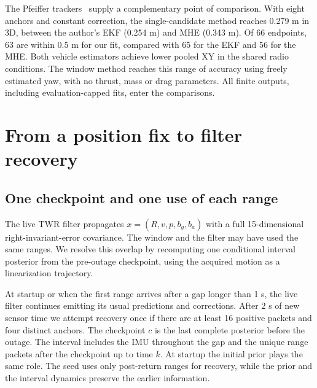 \documentclass{IEEEtaes}
\begin{document}
The Pfeiffer trackers~\cite{pfeiffer} supply a complementary point of comparison. With eight anchors and constant correction, the single-candidate method reaches 0.279 m in 3D, between the author's EKF (0.254 m) and MHE (0.343 m). Of 66 endpoints, 63 are within 0.5 m for our fit, compared with 65 for the EKF and 56 for the MHE. Both vehicle estimators achieve lower pooled XY in the shared radio conditions. The window method reaches this range of accuracy using freely estimated yaw, with no thrust, mass or drag parameters. All finite outputs, including evaluation-capped fits, enter the comparisons.

\section{From a position fix to filter recovery}\label{sec:handoff}
\subsection{One checkpoint and one use of each range}
The live TWR filter propagates \(x=(R,v,p,b_g,b_a)\) with a full 15-dimensional right-invariant-error covariance. The window and the filter may have used the same ranges. We resolve this overlap by recomputing one conditional interval posterior from the pre-outage checkpoint, using the acquired motion as a linearization trajectory.

At startup or when the first range arrives after a gap longer than 1 s, the live filter continues emitting its usual predictions and corrections. After 2 s of new sensor time we attempt recovery once if there are at least 16 positive packets and four distinct anchors. The checkpoint \(c\) is the last complete posterior before the outage. The interval includes the IMU throughout the gap and the unique range packets after the checkpoint up to time \(k\). At startup the initial prior plays the same role. The seed uses only post-return ranges for recovery, while the prior and the interval dynamics preserve the earlier information.
\end{document}
